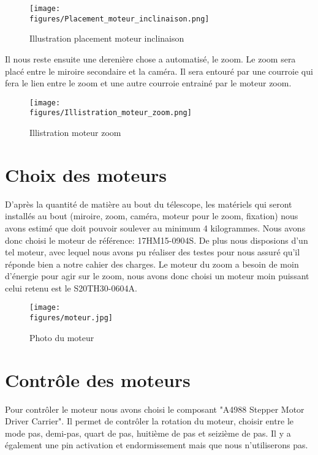 \begin{figure}[H]
    \centering
	\texttt{[image: \\figures/Placement\_moteur\_inclinaison.png]}
    \decoRule
    \caption[
    Illustration placement moteur inclinaison]{
    Illustration placement moteur inclinaison}
    \label{fig:Illustration placement moteur inclinaison}
    \end{figure}
    
Il nous reste ensuite une derenière chose a automatisé, le zoom. Le zoom sera placé entre le miroire secondaire et la caméra. Il sera entouré par une courroie qui fera le lien entre le zoom et une autre courroie entrainé par le moteur zoom.

\begin{figure}[H]
    \centering
	\texttt{[image: \\figures/Illistration\_moteur\_zoom.png]}
    \decoRule
    \caption[
    Illistration moteur zoom]{
    Illistration moteur zoom}
    \label{fig:Illistration moteur zoom}
    \end{figure}

\section{Choix des moteurs}

D'après la quantité de matière au bout du télescope, les matériels qui seront installés au bout (miroire, zoom, caméra, moteur pour le zoom, fixation) nous avons estimé que doit pouvoir soulever au minimum 4 kilogrammes.
Nous avons donc choisi le moteur de référence: 17HM15-0904S. De plus nous disposions d'un tel moteur, avec lequel nous avons pu réaliser des testes pour nous assuré qu'il réponde bien a notre cahier des charges.
Le moteur du zoom a besoin de moin d'énergie pour agir sur le zoom, nous avons donc choisi un moteur moin puissant celui retenu est le S20TH30-0604A.

\begin{figure}[H]
    \centering
	\texttt{[image: \\figures/moteur.jpg]}
    \decoRule
    \caption[
    Photo du moteur]{
    Photo du moteur}
    \label{fig:Photo du moteur}
    \end{figure}
    
\section{Contrôle des moteurs}

Pour contrôler le moteur nous avons choisi le composant "A4988 Stepper Motor Driver Carrier". Il permet de contrôler la rotation du moteur, choisir entre le mode pas, demi-pas, quart de pas, huitième de pas et seizième de pas. Il y a également une pin activation et endormissement mais que nous n'utiliserons pas.


